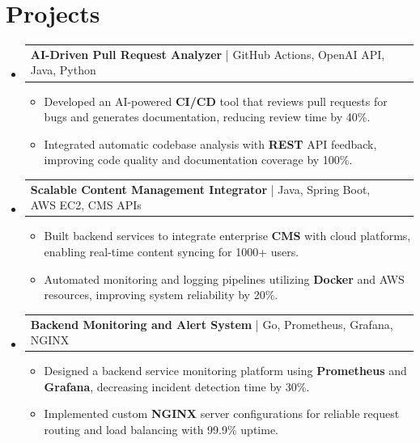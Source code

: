 \documentclass[letterpaper,11pt]{article}
\makeatletter
\newcommand{\resumeItem}[1]{
  \item\footnotesize{
    {#1 \vspace{-2pt}}
  }
}
\newcommand{\resumeProjectHeading}[2]{
    \item
    \begin{tabular*}{1.001\textwidth}{l@{\extracolsep{\fill}}r}
      \small#1 & \textbf{\small #2}\\
    \end{tabular*}\vspace{-7pt}
}
\newcommand{\resumeSubHeadingListStart}{\begin{itemize}[leftmargin=0pt, label={}]}
\newcommand{\resumeSubHeadingListEnd}{\end{itemize}}
\newcommand{\resumeItemListStart}{\begin{itemize}[leftmargin=*]}
\newcommand{\resumeItemListEnd}{\end{itemize}\vspace{-5pt}}
\makeatother
\begin{document}
\section{Projects}
    \vspace{-5pt}
    \resumeSubHeadingListStart
      \resumeProjectHeading
          {\textbf{AI-Driven Pull Request Analyzer} | GitHub Actions, OpenAI API, Java, Python}{}
          \resumeItemListStart
              \resumeItem{Developed an AI-powered \textbf{CI/CD} tool that reviews pull requests for bugs and generates documentation, reducing review time by 40\%.}
              \resumeItem{Integrated automatic codebase analysis with \textbf{REST} API feedback, improving code quality and documentation coverage by 100\%.}
          \resumeItemListEnd
          \vspace{-12pt}
      \resumeProjectHeading
          {\textbf{Scalable Content Management Integrator} | Java, Spring Boot, AWS EC2, CMS APIs}{}
          \resumeItemListStart
              \resumeItem{Built backend services to integrate enterprise \textbf{CMS} with cloud platforms, enabling real-time content syncing for 1000+ users.}
              \resumeItem{Automated monitoring and logging pipelines utilizing \textbf{Docker} and AWS resources, improving system reliability by 20\%.}
          \resumeItemListEnd
          \vspace{-12pt}
      \resumeProjectHeading
          {\textbf{Backend Monitoring and Alert System} | Go, Prometheus, Grafana, NGINX}{}
          \resumeItemListStart
              \resumeItem{Designed a backend service monitoring platform using \textbf{Prometheus} and \textbf{Grafana}, decreasing incident detection time by 30\%.}
              \resumeItem{Implemented custom \textbf{NGINX} server configurations for reliable request routing and load balancing with 99.9\% uptime.}
          \resumeItemListEnd 
    \resumeSubHeadingListEnd
\end{document}
